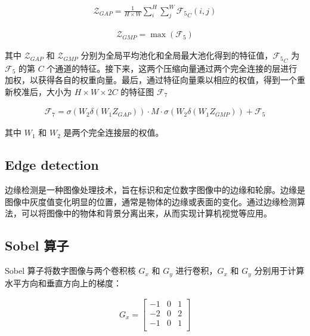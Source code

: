 \documentclass[a4paper, 10pt]{article}
\begin{document}
		\begin{equation}
			\begin{aligned}
				\mathcal{Z}_{GAP} = \frac{1}{H \times W} \sum_{i}^{H} \sum_{j}^{W} {\mathcal{F}_5}_C (i,j)
			\end{aligned}
			\label{eq: avgpool}
		\end{equation}
		
		\begin{equation}
			\begin{aligned}
				\mathcal{Z}_{GMP} = \max \left( \mathcal{F}_5 \right)
			\end{aligned}
			\label{eq: maxpool}
		\end{equation}
		
		其中 $\mathcal{Z}_{GAP}$ 和 $\mathcal{Z}_{GMP}$ 分别为全局平均池化和全局最大池化得到的特征值，${\mathcal{F}_5}_C$ 为 $\mathcal{F}_5$ 的第 $C$ 个通道的特征。接下来，这两个压缩向量通过两个完全连接的层进行加权，以获得各自的权重向量。最后，通过特征向量乘以相应的权值，得到一个重新校准后，大小为 $H \times W \times 2C$ 的特征图 $\mathcal{F}_7$
		
		\begin{equation}
			\begin{aligned}
				\mathcal{F}_7 = \sigma \left( W_2 \delta (W_1 Z_{GAP}) \right) \cdot M \cdot \sigma \left( W_2 \delta (W_1 Z_{GMP})\right) +  \mathcal{F}_5
			\end{aligned}
			\label{eq: recalibrated feature map}
		\end{equation}
		
		其中 $W_1$ 和 $W_2$ 是两个完全连接层的权值。
		
		\subsection{Edge detection}
		
		边缘检测是一种图像处理技术，旨在标识和定位数字图像中的边缘和轮廓。边缘是图像中灰度值变化明显的位置，通常是物体的边缘或表面的变化。通过边缘检测算法，可以将图像中的物体和背景分离出来，从而实现计算机视觉等应用。
		
		\subsection{Sobel 算子}
		
		Sobel 算子将数字图像与两个卷积核 $G_x$ 和 $G_y$ 进行卷积，$G_x$ 和 $G_y$ 分别用于计算水平方向和垂直方向上的梯度：
		
		\begin{equation*}
			\begin{aligned}
				G_x = 
				\begin{bmatrix}
					-1 & 0 & 1 \\
					-2 & 0 & 2 \\
					-1 & 0 & 1 \\
				\end{bmatrix}
			\end{aligned}
			\label{eq: Sobel_x}
		\end{equation*}
				
\end{document}
